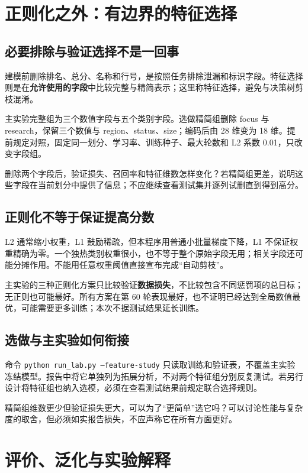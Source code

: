 \documentclass[UTF8,a4paper,11pt,fontset=fandol]{ctexart}
\begin{document}
\section{正则化之外：有边界的特征选择}
\subsection{必要排除与验证选择不是一回事}
建模前删除排名、总分、名称和行号，是按照任务排除泄漏和标识字段。特征选择则是在\textbf{允许使用的字段}中比较完整与精简表示；这里称特征选择，避免与决策树剪枝混淆。

主实验完整组为三个数值字段与五个类别字段。选做精简组删除 focus 与 research，保留三个数值与 region、status、size；编码后由 28 维变为 18 维。提前规定对照，固定同一划分、学习率、训练种子、最大轮数和 L2 系数 0.01，只改变字段组。
\begin{keybox}[对照必须回答的问题]
删除两个字段后，验证损失、召回率和特征维数怎样变化？若精简组更差，说明这些字段在当前划分中提供了信息；不应继续查看测试集并逐列试删直到得到高分。
\end{keybox}
\subsection{正则化不等于保证提高分数}
L2 通常缩小权重，L1 鼓励稀疏，但本程序用普通小批量梯度下降，L1 不保证权重精确为零。一个独热类别权重很小，也不等于整个原始字段无用；相关字段还可能分摊作用。不能用任意权重阈值直接宣布完成“自动剪枝”。

主实验的三种正则化方案只比较验证\textbf{数据损失}，不比较包含不同惩罚项的总目标；无正则也可能最好。所有方案在第 60 轮表现最好，也不证明已经达到全局数值最优，可能需要更多训练；本次不据测试结果延长训练。
\subsection{选做与主实验如何衔接}
命令 \texttt{python run\_lab.py --feature-study} 只读取训练和验证表，不覆盖主实验冻结模型。报告中将它单独列为拓展分析，不对两个特征组分别反复测试。若另行设计将特征组也纳入选模，必须在查看测试结果前规定联合选择规则。
\begin{questionbox}[C7 选做]
精简组维数更少但验证损失更大，可以为了“更简单”选它吗？可以讨论性能与复杂度的取舍，但必须如实报告损失，不应声称它在所有方面更好。
\end{questionbox}
\clearpage
\section{评价、泛化与实验解释}
\end{document}
